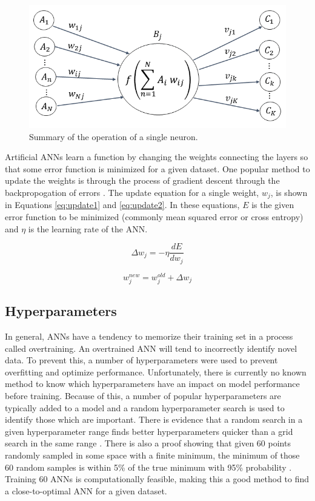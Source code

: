 \documentclass[tocnosub,noragright,centerchapter,12pt,fullpage]{uiucecethesis09}
\begin{document}
\begin{figure}
	\centering
	\includegraphics[width=0.65\linewidth]{images/Node_ABC_2}
	\caption{Summary of the operation of a single neuron.}
	\label{fig:Node}
\end{figure}

Artificial ANNs learn a function by changing the weights connecting the layers so that some error function is minimized for a given dataset. One popular method to update the weights is through the process of gradient descent through the backpropogation of errors \cite{Rumelhart1986}. The update equation for a single weight, $w_j$, is shown in Equations \ref{eq:update1} and \ref{eq:update2}. In these equations, $E$ is the given error function to be minimized (commonly mean squared error or cross entropy) and $\eta$ is the learning rate of the ANN.


\begin{equation} \label{eq:update1}
\Delta w_{j} = - \eta \frac{dE}{dw_j}
\end{equation}

\begin{equation} \label{eq:update2}
w^{new}_{j} = w^{old}_{j} + \Delta w_{j}
\end{equation}

\subsection{Hyperparameters}

In general, ANNs have a tendency to memorize their training set in a process called overtraining. An overtrained ANN will tend to incorrectly identify novel data. To prevent this, a number of hyperparameters were used to prevent overfitting and optimize performance. Unfortunately, there is currently no known method to know which hyperparameters have an impact on model performance before training. Because of this, a number of popular hyperparameters are typically added to a model and a random hyperparameter search is used to identify those which are important. There is evidence that a random search in a given hyperparameter range finds better hyperparameters quicker than a grid search in the same range \cite{Bergstra2012}. There is also a proof showing that given 60 points randomly sampled in some space with a finite minimum, the minimum of those 60 random samples is within 5\% of the true minimum with 95\% probability \cite{Zheng2015}. Training 60 ANNs is computationally feasible, making this a good method to find a close-to-optimal ANN for a given dataset. 
\end{document}
